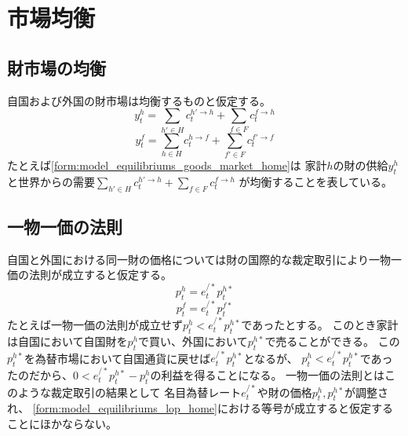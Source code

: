 
\section{市場均衡}
\label{sec:model_equilibriums}

\subsection{財市場の均衡}
\label{sec:model_equilibriums_goods_market}
自国および外国の財市場は均衡するものと仮定する。
\begin{equation}
y_t^h=\sum_{h'\in H}c_t^{h'\to h}+\sum_{f\in F}c_t^{f\to h}
\label{form:model_equilibriums_goods_market_home_eq}
\end{equation}
\begin{equation}
y_t^f=\sum_{h\in H}c_t^{h\to f}+\sum_{f'\in F}c_t^{f'\to f}
\label{form:model_equilibriums_goods_market_foreign_eq}
\end{equation}
たとえば\eqref{form:model_equilibriums_goods_market_home}は
家計\(h\)の財の供給\(y_t^h\)と世界からの需要\(\sum_{h'\in H}c_t^{h'\to h}+\sum_{f\in F}c_t^{f\to h}\)
が均衡することを表している。

\subsection{一物一価の法則}
\label{sec:model_equilibriums_lop}
自国と外国における同一財の価格については財の国際的な裁定取引により一物一価の法則が成立すると仮定する。
\begin{equation}
p_t^h=e_t^{/*}p_t^{h*}
\label{form:model_equilibriums_lop_home_eq}
\end{equation}
\begin{equation}
p_t^f=e_t^{/*}p_t^{f*}
\label{form:model_equilibriums_lop_foreign_eq}
\end{equation}
たとえば一物一価の法則が成立せず\(p_t^h<e_t^{/*}p_t^{h*}\)であったとする。
このとき家計は自国において自国財を\(p_t^h\)で買い、外国において\(p_t^{h*}\)で売ることができる。
この\(p_t^{h*}\)を為替市場において自国通貨に戻せば\(e_t^{/*}p_t^{h*}\)となるが、
\(p_t^h<e_t^{/*}p_t^{h*}\)であったのだから、\(0<e_t^{/*}p_t^{h*}-p_t^h\)の利益を得ることになる。
一物一価の法則とはこのような裁定取引の結果として
名目為替レート\(e_t^{/*}\)や財の価格\(p_t^h,p_t^{h*}\)が調整され、
\eqref{form:model_equilibriums_lop_home}における等号が成立すると仮定することにほかならない。